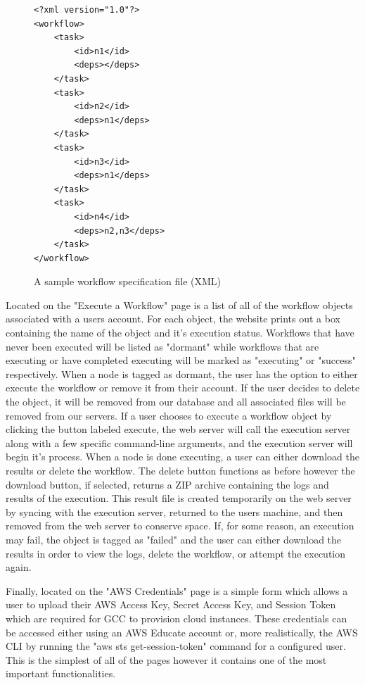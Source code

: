 \documentclass[fleqn,10pt]{SelfArx} %
\begin{document}
\begin{figure}[t]
\centering
\begin{tcolorbox}[boxrule=0.5pt,colback=cyan!15!white]
\begin{lstlisting}[basicstyle=\footnotesize, frame=lines]
<?xml version="1.0"?>
<workflow>
    <task>
        <id>n1</id>
        <deps></deps>
    </task>
    <task>
        <id>n2</id>
        <deps>n1</deps>
    </task>
    <task>
        <id>n3</id>
        <deps>n1</deps>
    </task>
    <task>
        <id>n4</id>
        <deps>n2,n3</deps>
    </task>
</workflow>
\end{lstlisting}
\end{tcolorbox}
\caption{A sample workflow specification file (XML)}
\label{fig:xmlspec}
\end{figure}

Located on the "Execute a Workflow" page is a list of all of the workflow objects associated with a users account. For each object, the website prints out a box containing the name of the object and it's execution status. Workflows that have never been executed will be listed as "dormant" while workflows that are executing or have completed executing will be marked as "executing" or "success" respectively. When a node is tagged as dormant, the user has the option to either execute the workflow or remove it from their account. If the user decides to delete the object, it will be removed from our database and all associated files will be removed from our servers. If a user chooses to execute a workflow object by clicking the button labeled execute, the web server will call the execution server along with a few specific command-line arguments, and the execution server will begin it's process. When a node is done executing, a user can either download the results or delete the workflow. The delete button functions as before however the download button, if selected, returns a ZIP archive containing the logs and results of the execution. This result file is created temporarily on the web server by syncing with the execution server, returned to the users machine, and then removed from the web server to conserve space. If, for some reason, an execution may fail, the object is tagged as "failed" and the user can either download the results in order to view the logs, delete the workflow, or attempt the execution again.

Finally, located on the "AWS Credentials" page is a simple form which allows a user to upload their AWS Access Key, Secret Access Key, and Session Token which are required for GCC to provision cloud instances. These credentials can be accessed either using an AWS Educate account or, more realistically, the AWS CLI by running the "aws sts get-session-token" command for a configured user. This is the simplest of all of the pages however it contains one of the most important functionalities.
\end{document}
